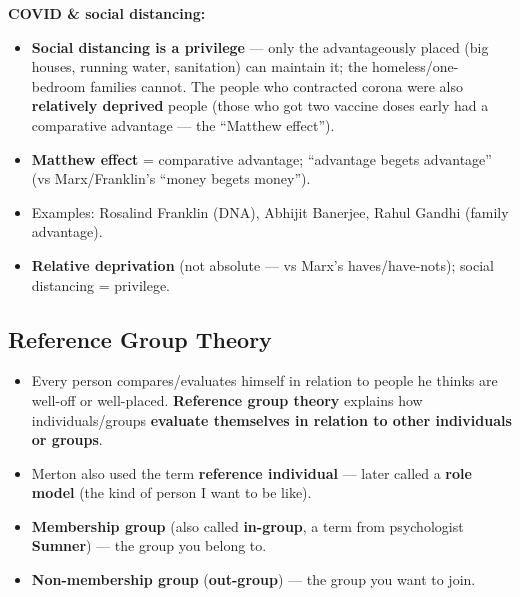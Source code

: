 \begin{ExampleBox}
\textbf{COVID \& social distancing:}
\begin{itemize}
\item \textbf{Social distancing is a privilege} --- only the advantageously placed (big houses, running water, sanitation) can maintain it; the homeless/one-bedroom families cannot. The people who contracted corona were also \textbf{relatively deprived} people (those who got two vaccine doses early had a comparative advantage --- the ``Matthew effect'').
\end{itemize}
\end{ExampleBox}

\begin{QuickRevision}
\begin{itemize}
\item \textbf{Matthew effect} = comparative advantage; ``advantage begets advantage'' (vs Marx/Franklin's ``money begets money'').
\item Examples: Rosalind Franklin (DNA), Abhijit Banerjee, Rahul Gandhi (family advantage).
\item \textbf{Relative deprivation} (not absolute --- vs Marx's haves/have-nots); social distancing = privilege.
\end{itemize}
\end{QuickRevision}

\sectiondivider

\subsection{Reference Group Theory}

\begin{KeyConcept}
\begin{itemize}
\item Every person compares/evaluates himself in relation to people he thinks are well-off or well-placed. \textbf{Reference group theory} explains how individuals/groups \textbf{evaluate themselves in relation to other individuals or groups}.
\item Merton also used the term \textbf{reference individual} --- later called a \textbf{role model} (the kind of person I want to be like).
\end{itemize}
\end{KeyConcept}

\begin{DataFact}
\begin{itemize}
\item \textbf{Membership group} (also called \textbf{in-group}, a term from psychologist \textbf{Sumner}) --- the group you belong to.
\item \textbf{Non-membership group} (\textbf{out-group}) --- the group you want to join.
\end{itemize}
\end{DataFact}

